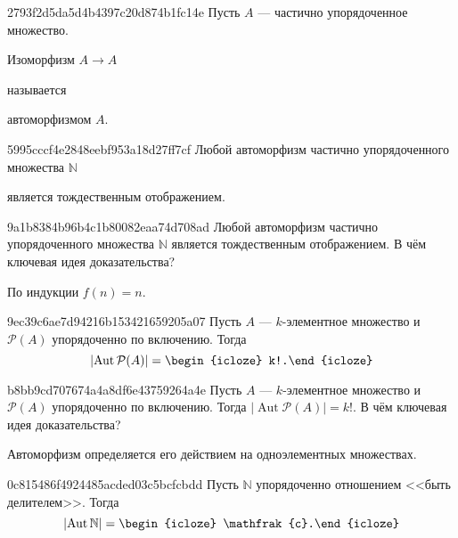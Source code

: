 \begin{note}{2793f2d5da5d4b4397c20d874b1fc14e}
    Пусть \({ A }\) --- частично упорядоченное множество.
    \begin{icloze}{2}Изоморфизм \({ A \to A }\)\end{icloze} называется \begin{icloze}{1}автоморфизмом \({ A }\).\end{icloze}
\end{note}

\begin{note}{5995cccf4e2848eebf953a18d27ff7cf}
    Любой автоморфизм частично упорядоченного множества \({ \mathbb N }\) \begin{icloze}{1}является тождественным отображением.\end{icloze}
\end{note}

\begin{note}{9a1b8384b96b4c1b80082eaa74d708ad}
    Любой автоморфизм частично упорядоченного множества \({ \mathbb N }\) является тождественным отображением.
    В чём ключевая идея доказательства?

    \begin{cloze}{1}
        По индукции \({ f(n) = n }\).
    \end{cloze}
\end{note}

\begin{note}{9ec39c6ae7d94216b153421659205a07}
    Пусть \({ A }\) --- \({ k }\)-элементное множество и \({ \mathcal P(A) }\) упорядоченно по включению.
    Тогда
    \[
        \left\lvert \operatorname{Aut} \mathcal P(A) \right\rvert = \begin{icloze}{1}k!.\end{icloze}
    \]
\end{note}

\begin{note}{b8bb9cd707674a4a8df6e43759264a4e}
    Пусть \({ A }\) --- \({ k }\)-элементное множество и \({ \mathcal P(A) }\) упорядоченно по включению.
    Тогда \({ \left\lvert \operatorname{Aut} \mathcal P(A) \right\rvert = k! }\).
    В чём ключевая идея доказательства?

    \begin{cloze}{1}
        Автоморфизм определяется его действием на одно\-э\-ле\-мен\-тных множествах.
    \end{cloze}
\end{note}

\begin{note}{0c815486f4924485acded03c5bcfcbdd}
    Пусть \({ \mathbb N }\) упорядоченно отношением <<быть делителем>>.
    Тогда
    \[
        \left\lvert \operatorname{Aut} \mathbb N \right\rvert = \begin{icloze}{1}\mathfrak{c}.\end{icloze}
    \]
\end{note}

